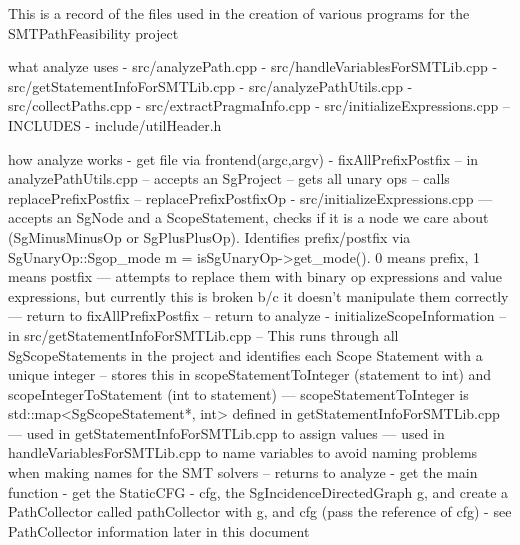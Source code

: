 This is a record of the files used in the creation of various programs for the SMTPathFeasibility project

what analyze uses
- src/analyzePath.cpp
- src/handleVariablesForSMTLib.cpp
- src/getStatementInfoForSMTLib.cpp
- src/analyzePathUtils.cpp
- src/collectPaths.cpp
- src/extractPragmaInfo.cpp
- src/initializeExpressions.cpp
-- INCLUDES 
- include/utilHeader.h

how analyze works
- get file via frontend(argc,argv)
- fixAllPrefixPostfix
-- in analyzePathUtils.cpp
-- accepts an SgProject
-- gets all unary ops
-- calls replacePrefixPostfix
-- replacePrefixPostfixOp - src/initializeExpressions.cpp
--- accepts an SgNode and a ScopeStatement, checks if it is a node we care about (SgMinusMinusOp or SgPlusPlusOp). Identifies prefix/postfix via SgUnaryOp::Sgop_mode m = isSgUnaryOp->get_mode(). 0 means prefix, 1 means postfix
--- attempts to replace them with binary op expressions and value expressions, but currently this is broken b/c it doesn't manipulate them correctly
--- return to fixAllPrefixPostfix
-- return to analyze
- initializeScopeInformation
-- in src/getStatementInfoForSMTLib.cpp
-- This runs through all SgScopeStatements in the project and identifies each Scope Statement with a unique integer
-- stores this in scopeStatementToInteger (statement to int) and scopeIntegerToStatement (int to statement)
--- scopeStatementToInteger is std::map<SgScopeStatement*, int> defined in getStatementInfoForSMTLib.cpp
--- used in getStatementInfoForSMTLib.cpp to assign values
--- used in handleVariablesForSMTLib.cpp to name variables to avoid naming problems when making names for the SMT solvers
-- returns to analyze
- get the main function
- get the StaticCFG - cfg, the SgIncidenceDirectedGraph g, and create a PathCollector called pathCollector with g, and cfg (pass the reference of cfg)
- see PathCollector information later in this document




